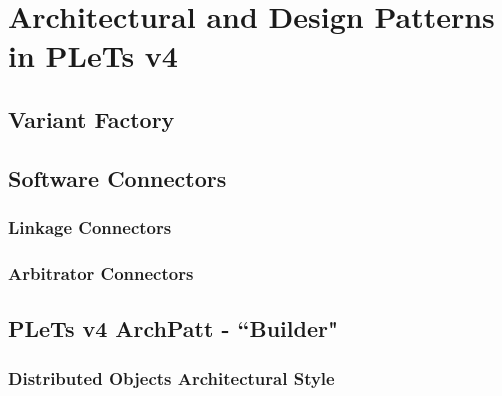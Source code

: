 \chapter{Architectural and Design Patterns in PLeTs v4}
\label{ch:patterns}


\section{Variant Factory}


\section{Software Connectors}


\subsection{Linkage Connectors}


\subsection{Arbitrator Connectors}


\section{PLeTs v4 ArchPatt - ``Builder"}


\subsection{Distributed Objects Architectural Style}
